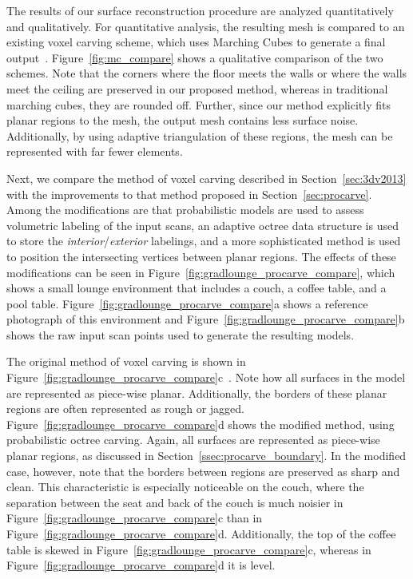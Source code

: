 \documentclass[12pt,onecolumn,oneside]{book}
\begin{document}
The results of our surface reconstruction procedure are analyzed quantitatively and qualitatively.  For quantitative analysis, the resulting mesh is compared to an existing voxel carving scheme, which uses Marching Cubes to generate a final output~\cite{Carving}.  Figure~\ref{fig:mc_compare} shows a qualitative comparison of the two schemes.  Note that the corners where the floor meets the walls or where the walls meet the ceiling are preserved in our proposed method, whereas in traditional marching cubes, they are rounded off.  Further, since our method explicitly fits planar regions to the mesh, the output mesh contains less surface noise.  Additionally, by using adaptive triangulation of these regions, the mesh can be represented with far fewer elements.

Next, we compare the method of voxel carving described in Section~\ref{sec:3dv2013} with the improvements to that method proposed in Section~\ref{sec:procarve}.  Among the modifications are that probabilistic models are used to assess volumetric labeling of the input scans, an adaptive octree data structure is used to store the {\it interior}/{\it exterior} labelings, and a more sophisticated method is used to position the intersecting vertices between planar regions.  The effects of these modifications can be seen in Figure~\ref{fig:gradlounge_procarve_compare}, which shows a small lounge environment that includes a couch, a coffee table, and a pool table.  Figure~\ref{fig:gradlounge_procarve_compare}a shows a reference photograph of this environment and Figure~\ref{fig:gradlounge_procarve_compare}b shows the raw input scan points used to generate the resulting models.  

The original method of voxel carving is shown in Figure~\ref{fig:gradlounge_procarve_compare}c~\cite{Turner13}.  Note how all surfaces in the model are represented as piece-wise planar.  Additionally, the borders of these planar regions are often represented as rough or jagged.  Figure~\ref{fig:gradlounge_procarve_compare}d shows the modified method, using probabilistic octree carving.  Again, all surfaces are represented as piece-wise planar regions, as discussed in Section~\ref{ssec:procarve_boundary}.  In the modified case, however, note that the borders between regions are preserved as sharp and clean.  This characteristic is especially noticeable on the couch, where the separation between the seat and back of the couch is much noisier in Figure~\ref{fig:gradlounge_procarve_compare}c than in Figure~\ref{fig:gradlounge_procarve_compare}d.  Additionally, the top of the coffee table is skewed in Figure~\ref{fig:gradlounge_procarve_compare}c, whereas in Figure~\ref{fig:gradlounge_procarve_compare}d it is level.
\end{document}
